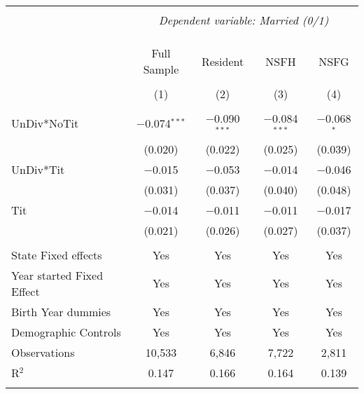 
\begingroup 
\footnotesize 
\begin{tabular}{@{\extracolsep{5pt}}lcccc} 
\\[-1.8ex]\hline 
\hline \\[-1.8ex] 
 & \multicolumn{4}{c}{\textit{Dependent variable: Married (0/1)}} \\ 
\cline{2-5} 
\\[-1.8ex] &  &  &  & \\[-4.8ex] \\ 
 & Full Sample & Resident & NSFH & NSFG \\ 
\\[-1.8ex] & (1) & (2) & (3) & (4)\\ 
\hline \\[-1.8ex] 
 UnDiv*NoTit & $-$0.074$^{***}$ & $-$0.090$^{***}$ & $-$0.084$^{***}$ & $-$0.068$^{*}$ \\ 
  & (0.020) & (0.022) & (0.025) & (0.039) \\ 
  UnDiv*Tit & $-$0.015 & $-$0.053 & $-$0.014 & $-$0.046 \\ 
  & (0.031) & (0.037) & (0.040) & (0.048) \\ 
  Tit & $-$0.014 & $-$0.011 & $-$0.011 & $-$0.017 \\ 
  & (0.021) & (0.026) & (0.027) & (0.037) \\ 
 \hline \\[-1.8ex] 
State Fixed effects & Yes & Yes & Yes & Yes \\ 
Year started Fixed Effect & Yes & Yes & Yes & Yes \\ 
Birth Year dummies & Yes & Yes & Yes & Yes \\ 
Demographic Controls & Yes & Yes & Yes & Yes \\ 
Observations & 10,533 & 6,846 & 7,722 & 2,811 \\ 
R$^{2}$ & 0.147 & 0.166 & 0.164 & 0.139 \\ 
\hline 
\hline \\[-1.8ex] 
\end{tabular} 
\endgroup 
